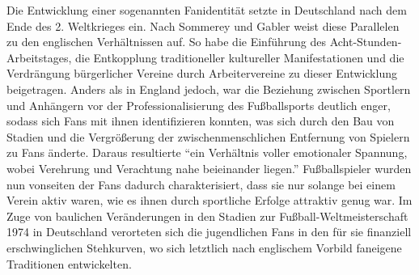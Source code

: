 Die Entwicklung einer sogenannten Fanidentität setzte in Deutschland nach dem Ende des 2. Weltkrieges ein.
Nach Sommerey und Gabler weist diese Parallelen zu den englischen Verhältnissen auf.
So habe die Einführung des Acht-Stunden-Arbeitstages, die Entkopplung traditioneller kultureller Manifestationen und die Verdrängung bürgerlicher Vereine durch Arbeitervereine zu dieser Entwicklung beigetragen.
Anders als in England jedoch, war die Beziehung zwischen Sportlern und Anhängern vor der Professionalisierung des Fußballsports deutlich enger, sodass sich Fans mit ihnen identifizieren konnten, was sich durch den Bau von Stadien und die Vergrößerung der zwischenmenschlichen Entfernung von Spielern zu Fans änderte.
Daraus resultierte "`ein Verhältnis voller emotionaler Spannung, wobei Verehrung und Verachtung nahe beieinander liegen."'
Fußballspieler wurden nun vonseiten der Fans dadurch charakterisiert, dass sie nur solange bei einem Verein aktiv waren, wie es ihnen durch sportliche Erfolge attraktiv genug war.
Im Zuge von baulichen Veränderungen in den Stadien zur Fußball-Weltmeisterschaft 1974 in Deutschland verorteten sich die jugendlichen Fans in den für sie finanziell erschwinglichen Stehkurven, wo sich letztlich nach englischem Vorbild faneigene Traditionen entwickelten.
